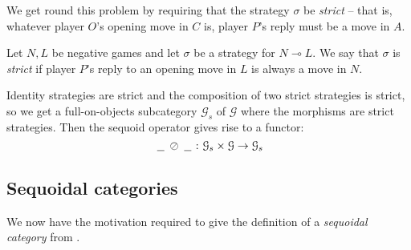 \documentclass[a4paper,UKenglish]{lipics-v2016}
\theoremstyle{plain}
\theoremstyle{definition}
\newcommand*\from{\colon}
\newcommand{\sequoid}{\oslash}
\renewcommand{\implies}{\multimap}
\newcommand{\G}{\mathcal G}
\newcommand{\blank}{\;\underline{\hspace{1.5ex}}\;}
\begin{document}
We get round this problem by requiring that the strategy $\sigma$ be \emph{strict} -- that is, whatever player $O$'s opening move in $C$ is, player $P$'s reply must be a move in $A$.  

\begin{definition}
  Let $N,L$ be negative games and let $\sigma$ be a strategy for $N\implies L$.  We say that $\sigma$ is \emph{strict} if player $P$'s reply to an opening move in $L$ is always a move in $N$.  
\end{definition}

Identity strategies are strict and the composition of two strict strategies is strict, so we get a full-on-objects subcategory $\G_s$ of $\G$ where the morphisms are strict strategies.  Then the sequoid operator gives rise to a functor:
\[
  \blank\sequoid\blank\from \G_s\times\G\to\G_s
  \]

\subsection{Sequoidal categories}

We now have the motivation required to give the definition of a \emph{sequoidal category} from \cite{laird02}.  
\end{document}

